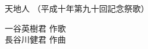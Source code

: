 \documentclass[10pt,b5j]{tarticle} %
\begin{document}
\begin{minipage}[c]{0.7\hsize} %
    \begin{center}
        {\LARGE
            天地人 %
        }
        {\small 
            （平成十年第九十回記念祭歌） %
        }
    \end{center}
\end{minipage}
\begin{minipage}[c]{0.3\hsize} %
    \begin{flushright} %
        一谷英樹君 作歌\\長谷川健君 作曲 %
    \end{flushright}
\end{minipage}
\end{document}
